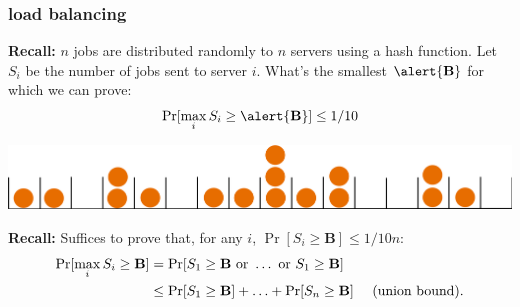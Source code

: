 \documentclass[compress]{beamer}
\newcommand{\bv}[1]{\mathbf{#1}}
\begin{document}
%	
%	
%	
%	
%	


\begin{frame}
	\frametitle{load balancing}
	\small
	\textbf{Recall:} $n$ jobs are distributed randomly to $n$ servers using a hash function. Let $S_i$ be the number of jobs sent to server $i$.  What's the smallest $\alert{\mathbf{B}}$ for which we can prove:
	\begin{align*}
		\Pr[\max_i S_i \geq \alert{\mathbf{B}}] \leq 1/10
	\end{align*}
	\vspace{-1em}
	\begin{center}
		\includegraphics[width=.6\textwidth]{ballsinbins.png}
	\end{center}
	
	\textbf{Recall:} Suffices to prove that, for any $i$, $\Pr[ S_i \geq {\mathbf{B}}] \leq 1/10n$:
	\begin{align*}
		\Pr[\max_i S_i \geq {\mathbf{B}}] &= \Pr[S_1 \geq {\mathbf{B}} \text{ or } \ldots \text{ or } S_1 \geq {\mathbf{B}}] \\
		&\leq \Pr[S_1 \geq {\mathbf{B}}] + \ldots + \Pr[S_n \geq {\mathbf{B}}] \text{\hspace{1em} (union bound)}.
	\end{align*}
\end{frame}
\end{document}
